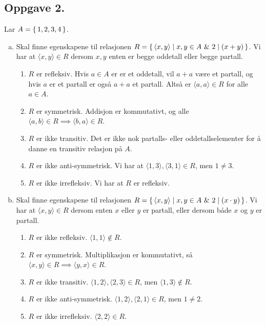 \documentclass{article}
\begin{document}
\subsection*{Oppgave 2.}
Lar $A = \set{1, 2, 3, 4}$.
\begin{enumerate}[(a)]
	\item {
		Skal finne egenskapene til relasjonen $R = \set{\langle x, y \rangle \mid x, y \in A \text{ \& } 2 \mid (x + y)}$. Vi har at $\langle x, y \rangle \in R$ dersom 
		$x, y$ enten er begge oddetall eller begge partall.
		\begin{enumerate} [1.]
		\item {
			$R$ er refleksiv. Hvis $a \in A$ er er et oddetall, vil $a + a$ være et partall, og hvis $a$ er et partall er også $a + a$ et partall. Altså er 
			$\langle a, a \rangle \in R$ for alle $a \in A$.
		}
		\item {
			$R$ er symmetrisk. Addisjon er kommutativt, og alle $\langle a, b \rangle \in R \implies \langle b, a \rangle \in R$.
		}
		\item {
			$R$ er ikke transitiv. Det er ikke nok partalls- eller oddetallselementer for å danne en transitiv relasjon på $A$.
		}
		\item {
			$R$ er ikke anti-symmetrisk. Vi har at $\langle 1, 3 \rangle, \langle 3, 1 \rangle \in R$, men $1 \neq 3$.
		}
		\item {
			$R$ er ikke irrefleksiv. Vi har at $R$ er refleksiv.
		}
		\end{enumerate}
	}
	\item {
		Skal finne egenskapene til relasjonen $R = \set{\langle x, y \rangle \mid x, y \in A \text{ \& } 2 \mid (x \cdot y)}$. Vi har at $\langle x, y \rangle \in R$ dersom 
		enten $x$ eller $y$ er partall, eller dersom både $x$ og $y$ er partall.
		\begin{enumerate} [1.]
		\item {
			$R$ er ikke refleksiv. $\langle 1, 1 \rangle \notin R$.
		}
		\item {
			$R$ er symmetrisk. Multiplikasjon er kommutativt, så $\langle x, y \rangle \in R \implies \langle y, x \rangle \in R$.
		}
		\item {
			$R$ er ikke transitiv. $\langle 1, 2 \rangle, \langle 2, 3 \rangle \in R$, men $\langle 1, 3 \rangle \notin R$.
		}
		\item {
			$R$ er ikke anti-symmetrisk. $\langle 1, 2 \rangle, \langle 2, 1 \rangle \in R$, men $1 \neq 2$.
		}
		\item {
			$R$ er ikke irrefleksiv. $\langle 2, 2 \rangle \in R$.
		}
		\end{enumerate}
	}
\end{enumerate}
\end{document}
